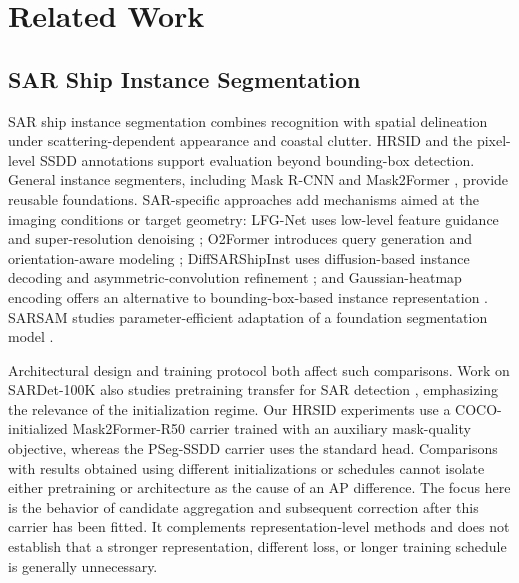 \section{Related Work}
\label{sec:related}

\subsection{SAR Ship Instance Segmentation}
\label{sec:related-sar}
SAR ship instance segmentation combines recognition with spatial delineation under scattering-dependent appearance and coastal clutter. HRSID \cite{hrsid2020} and the pixel-level SSDD annotations \cite{ssdd2021} support evaluation beyond bounding-box detection. General instance segmenters, including Mask R-CNN \cite{maskrcnn2017} and Mask2Former \cite{mask2former2022}, provide reusable foundations. SAR-specific approaches add mechanisms aimed at the imaging conditions or target geometry: LFG-Net uses low-level feature guidance and super-resolution denoising \cite{lfgnet2022}; O2Former introduces query generation and orientation-aware modeling \cite{o2former2026}; DiffSARShipInst uses diffusion-based instance decoding and asymmetric-convolution refinement \cite{diffsar2025}; and Gaussian-heatmap encoding offers an alternative to bounding-box-based instance representation \cite{gaussheatmap2024}. SARSAM studies parameter-efficient adaptation of a foundation segmentation model \cite{sarsam2025}.

Architectural design and training protocol both affect such comparisons. Work on SARDet-100K also studies pretraining transfer for SAR detection \cite{sardet100k2024}, emphasizing the relevance of the initialization regime. Our HRSID experiments use a COCO-initialized Mask2Former-R50 carrier trained with an auxiliary mask-quality objective, whereas the PSeg-SSDD carrier uses the standard head. Comparisons with results obtained using different initializations or schedules cannot isolate either pretraining or architecture as the cause of an AP difference. The focus here is the behavior of candidate aggregation and subsequent correction after this carrier has been fitted. It complements representation-level methods and does not establish that a stronger representation, different loss, or longer training schedule is generally unnecessary.

